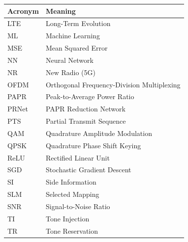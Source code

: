 \begin{center}
\vspace{1cm}
\begin{tabular}{l l}
\toprule
    \textbf{Acronym} & \textbf{Meaning} \\
\midrule
LTE     & Long-Term Evolution \\
ML      & Machine Learning \\
MSE     & Mean Squared Error \\
NN      & Neural Network \\
NR      & New Radio (5G) \\
OFDM    & Orthogonal Frequency-Division Multiplexing \\
PAPR    & Peak-to-Average Power Ratio \\
PRNet   & PAPR Reduction Network \\
PTS     & Partial Transmit Sequence \\
QAM     & Quadrature Amplitude Modulation \\
QPSK    & Quadrature Phase Shift Keying \\
ReLU    & Rectified Linear Unit \\
SGD     & Stochastic Gradient Descent \\
SI      & Side Information \\
SLM     & Selected Mapping \\
SNR     & Signal-to-Noise Ratio \\
TI      & Tone Injection \\
TR      & Tone Reservation \\
\bottomrule
\end{tabular}
\end{center}

